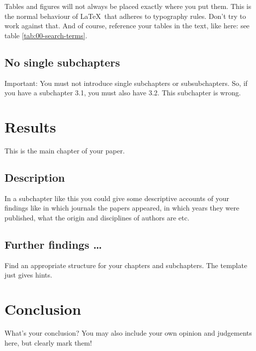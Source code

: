 \documentclass[output=paper]{langscibook}
\begin{document}
\noindent Tables and figures will not always be placed exactly where you put them. This is the normal behaviour of \LaTeX\ that adheres to typography rules. Don't try to work against that. And of course, reference your tables in the text, like here: see table \ref{tab:00-search-terms}.
 
 \subsection{No single subchapters}
 
 Important: You must not introduce single subchapters or subsubchapters. So, if you have a subchapter 3.1, you must also have 3.2. This subchapter is wrong.
 
\section{Results} 

This is the main chapter of your paper. 

\subsection{Description}

In a subchapter like this you could give some descriptive accounts of your findings like in which journals the papers appeared, in which years they were published, what the origin and disciplines of authors are etc.

\subsection{Further findings \dots}

Find an appropriate structure for your chapters and subchapters. The template just gives hints.

\section{Conclusion}

What's your conclusion? You may also include your own opinion and judgements here, but clearly mark them!

    \printbibliography[heading=subbibliography,notkeyword=this]
\end{document}
